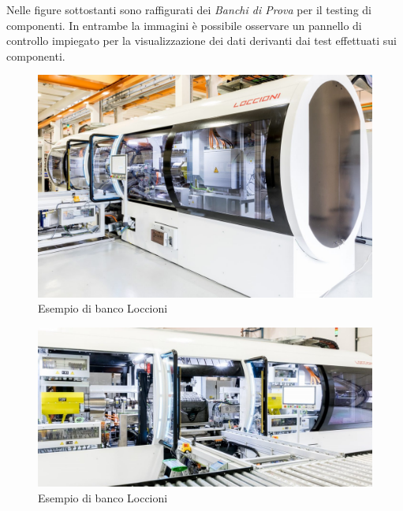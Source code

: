 \pagebreak
Nelle figure sottostanti sono raffigurati dei \textit{Banchi di Prova} per il testing di componenti. In entrambe la immagini è possibile osservare un pannello di controllo impiegato per la visualizzazione dei dati derivanti dai test effettuati sui componenti.
\begin{figure}[h!]
\begin{center}
  \includegraphics[width=15cm]{images/banco.jpg}
 \caption{Esempio di banco Loccioni}
 \label{fig:bancoLoccioni}
\end{center}
\end{figure}
\begin{figure}[h!]
\begin{center}
  \includegraphics[width=15cm]{images/linea.jpg}
 \caption{Esempio di banco Loccioni}
 \label{fig:dashLoccioni}
\end{center}
\end{figure}

\pagebreak
